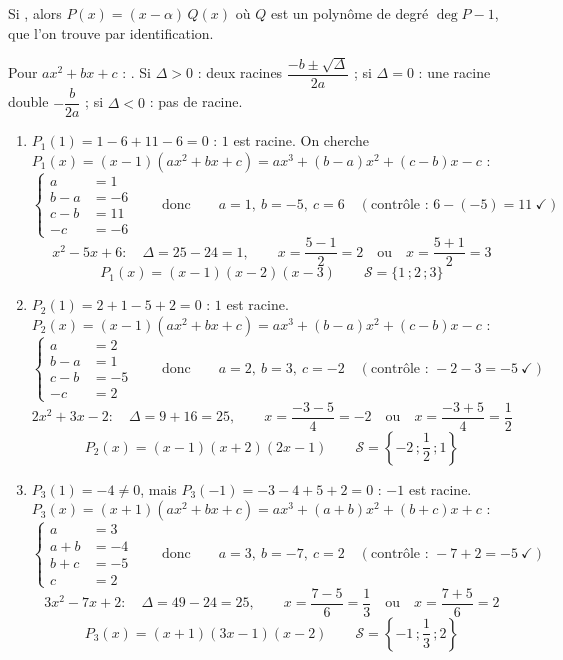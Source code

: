 \begin{prop}[Factorisation]
Si , alors $P(x)=(x-\alpha)\,Q(x)$ où $Q$ est un polynôme de degré $\deg P-1$, que l'on trouve par identification.
\end{prop}
\begin{prop}[Trinôme]
Pour $ax^2+bx+c$ : . Si $\Delta>0$ : deux racines $\dfrac{-b\pm\sqrt\Delta}{2a}$ ; si $\Delta=0$ : une racine double $-\dfrac{b}{2a}$ ; si $\Delta<0$ : pas de racine.
\end{prop}
\begin{enumerate}[itemsep=14pt]
  \item $P_1(1)=1-6+11-6=0$ : $1$ est racine. On cherche $P_1(x)=(x-1)(ax^2+bx+c)=ax^3+(b-a)x^2+(c-b)x-c$ :
  \[
  \left\{
  \begin{aligned}
    a&=1\\
    b-a&=-6\\
    c-b&=11\\
    -c&=-6
  \end{aligned}
  \right.
  \qquad\text{donc}\qquad a=1,\ b=-5,\ c=6\quad(\text{contrôle : }6-(-5)=11\ \checkmark)
  \]
  \[x^2-5x+6:\quad\Delta=25-24=1,\qquad x=\dfrac{5-1}{2}=2\quad\text{ou}\quad x=\dfrac{5+1}{2}=3\]
  \[P_1(x)=(x-1)(x-2)(x-3)\qquad\mathcal S=\{1\,;2\,;3\}\]

  \item $P_2(1)=2+1-5+2=0$ : $1$ est racine. $P_2(x)=(x-1)(ax^2+bx+c)=ax^3+(b-a)x^2+(c-b)x-c$ :
  \[
  \left\{
  \begin{aligned}
    a&=2\\
    b-a&=1\\
    c-b&=-5\\
    -c&=2
  \end{aligned}
  \right.
  \qquad\text{donc}\qquad a=2,\ b=3,\ c=-2\quad(\text{contrôle : }-2-3=-5\ \checkmark)
  \]
  \[2x^2+3x-2:\quad\Delta=9+16=25,\qquad x=\dfrac{-3-5}{4}=-2\quad\text{ou}\quad x=\dfrac{-3+5}{4}=\dfrac12\]
  \[P_2(x)=(x-1)(x+2)(2x-1)\qquad\mathcal S=\left\{-2\,;\dfrac12\,;1\right\}\]

  \item $P_3(1)=-4\neq0$, mais $P_3(-1)=-3-4+5+2=0$ : $-1$ est racine. $P_3(x)=(x+1)(ax^2+bx+c)=ax^3+(a+b)x^2+(b+c)x+c$ :
  \[
  \left\{
  \begin{aligned}
    a&=3\\
    a+b&=-4\\
    b+c&=-5\\
    c&=2
  \end{aligned}
  \right.
  \qquad\text{donc}\qquad a=3,\ b=-7,\ c=2\quad(\text{contrôle : }-7+2=-5\ \checkmark)
  \]
  \[3x^2-7x+2:\quad\Delta=49-24=25,\qquad x=\dfrac{7-5}{6}=\dfrac13\quad\text{ou}\quad x=\dfrac{7+5}{6}=2\]
  \[P_3(x)=(x+1)(3x-1)(x-2)\qquad\mathcal S=\left\{-1\,;\dfrac13\,;2\right\}\]


\end{enumerate}
